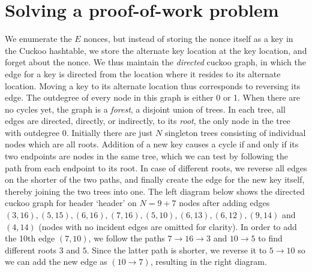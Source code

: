 \documentclass[11pt, oneside]{article}
\begin{document}
\section{Solving a proof-of-work problem}
We enumerate the $E$ nonces, but instead of storing the nonce itself as a key
in the Cuckoo hashtable, we store the alternate key location at the key location,
and forget about the nonce.
We thus maintain the {\em directed} cuckoo graph, in which the edge for a key
is directed from the location where it resides to its alternate location.
Moving a key to its alternate location thus corresponds to reversing its edge.
The outdegree of every node in this graph is either 0 or 1.
When there are no cycles yet, the graph is a {\em forest}, a disjoint union of trees.
In each tree, all edges are directed, directly, or indirectly, to its {\em root},
the only node in the tree with outdegree 0.
Initially there are just $N$ singleton trees consisting of individual nodes which are all roots.
Addition of a new key causes a cycle if and only if its two endpoints are nodes in the same tree,
which we can test by following the path from each endpoint to its root.
In case of different roots, we reverse all edges on the shorter of the two paths,
and finally create the edge for the new key itself, thereby joining the two trees into one.
The left diagram below shows the directed cuckoo graph for header `header' on $N=9+7$ nodes after adding edges
$(3,16),(5,15),(6,16),(7,16),(5,10),(6,13),(6,12),(9,14)$ and $(4,14)$ (nodes with no incident edges are omitted for clarity).
In order to add the 10th edge $(7,10)$, we follow the paths $7 \rightarrow 16 \rightarrow 3$ and $10 \rightarrow 5$
to find different roots $3$ and $5$. Since the latter path is shorter, we reverse it to $5 \rightarrow 10$ so we can
add the new edge as $(10 \rightarrow 7)$, resulting in the right diagram.
\end{document}
